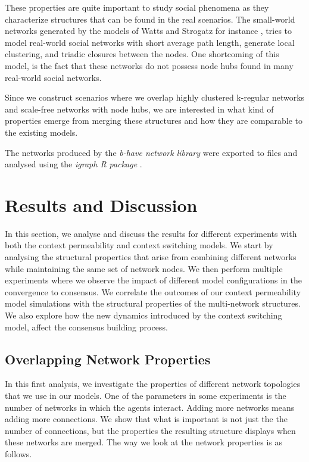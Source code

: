 \documentclass[preprint,number]{elsarticle}
\begin{document}
These properties are quite important to study social phenomena as they characterize structures that 
can be found in the real scenarios. The small-world networks generated by the models of Watts and Strogatz for instance \cite{Watts1998}, tries to model real-world social networks with short average path length, generate local clustering, and triadic closures between the nodes. One shortcoming of this model, is the fact that these networks do not possess node hubs found in many real-world social networks.

Since we construct scenarios where we overlap highly clustered k-regular networks and scale-free networks with node hubs, we are interested in what kind of properties emerge from merging these structures and how they are comparable to the existing models. 

The networks produced by the \textit{b-have network library} \cite{Nunes:Software:11069} were exported to files and analysed using the \textit{igraph R package} \cite{igraph2006}. 

\section{Results and Discussion}
\label{sec:results-discussion}

In this section, we analyse and discuss the results for different experiments with both the
context permeability and context switching models. We start by analysing the structural properties
that arise from combining different networks while maintaining the same set of network nodes. We then perform multiple experiments where we observe the impact of different model configurations in the convergence to consensus. We correlate the outcomes of our context permeability model simulations with the structural properties of the multi-network structures. We also explore how the new dynamics introduced by the context switching model, affect the consensus building process. 

\subsection{Overlapping Network Properties}
\label{sec:network_properties}
In this first analysis, we investigate the properties of different network topologies that we use in our models. 
One of the parameters in some experiments is the number of networks in which the agents interact. Adding more networks means adding more connections. 
We show that what is important is not just the the number of connections, but the properties the resulting structure displays when these networks are merged. The way we look at the network properties is as follows.
\end{document}
